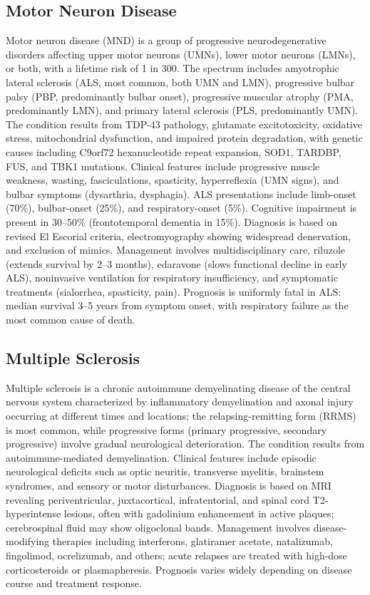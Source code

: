 \subsection{Motor Neuron Disease}
\label{sec:Motor Neuron Disease}
Motor neuron disease (MND) is a group of progressive neurodegenerative disorders affecting upper motor neurons (UMNs), lower motor neurons (LMNs), or both, with a lifetime risk of 1 in 300. The spectrum includes amyotrophic lateral sclerosis (ALS, most common, both UMN and LMN), progressive bulbar palsy (PBP, predominantly bulbar onset), progressive muscular atrophy (PMA, predominantly LMN), and primary lateral sclerosis (PLS, predominantly UMN). The condition results from TDP-43 pathology, glutamate excitotoxicity, oxidative stress, mitochondrial dysfunction, and impaired protein degradation, with genetic causes including C9orf72 hexanucleotide repeat expansion, SOD1, TARDBP, FUS, and TBK1 mutations. Clinical features include progressive muscle weakness, wasting, fasciculations, spasticity, hyperreflexia (UMN signs), and bulbar symptoms (dysarthria, dysphagia). ALS presentations include limb-onset (70\%), bulbar-onset (25\%), and respiratory-onset (5\%). Cognitive impairment is present in 30--50\% (frontotemporal dementia in 15\%). Diagnosis is based on revised El Escorial criteria, electromyography showing widespread denervation, and exclusion of mimics. Management involves multidisciplinary care, riluzole (extends survival by 2--3 months), edaravone (slows functional decline in early ALS), noninvasive ventilation for respiratory insufficiency, and symptomatic treatments (sialorrhea, spasticity, pain). Prognosis is uniformly fatal in ALS: median survival 3--5 years from symptom onset, with respiratory failure as the most common cause of death.

\subsection{Multiple Sclerosis}
\label{sec:Multiple Sclerosis}
Multiple sclerosis is a chronic autoimmune demyelinating disease of the central nervous system characterized by inflammatory demyelination and axonal injury occurring at different times and locations; the relapsing-remitting form (RRMS) is most common, while progressive forms (primary progressive, secondary progressive) involve gradual neurological deterioration. The condition results from autoimmune-mediated demyelination. Clinical features include episodic neurological deficits such as optic neuritis, transverse myelitis, brainstem syndromes, and sensory or motor disturbances. Diagnosis is based on MRI revealing periventricular, juxtacortical, infratentorial, and spinal cord T2-hyperintense lesions, often with gadolinium enhancement in active plaques; cerebrospinal fluid may show oligoclonal bands. Management involves disease-modifying therapies including interferons, glatiramer acetate, natalizumab, fingolimod, ocrelizumab, and others; acute relapses are treated with high-dose corticosteroids or plasmapheresis. Prognosis varies widely depending on disease course and treatment response.

